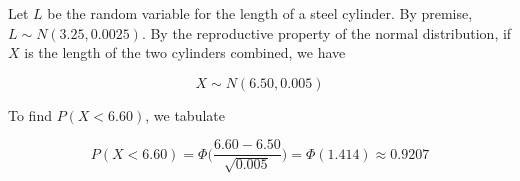 \documentclass[10pt, oneside]{article}
\begin{document}
\begin{enumerate}[label=10.\arabic*]
Let $L$ be the random variable for the length of a steel cylinder. By premise, $L \sim N(3.25, 0.0025)$. By the reproductive property of the normal distribution, if $X$ is the length of the two cylinders combined, we have

\[ X \sim N(6.50, 0.005) \]

To find $P(X < 6.60)$, we tabulate

\[ P(X < 6.60) = \Phi \bigg( \frac{6.60 - 6.50}{\sqrt{0.005}} \bigg) = \Phi(1.414) \approx \boxed{0.9207} \]

\end{enumerate}
\end{document}

